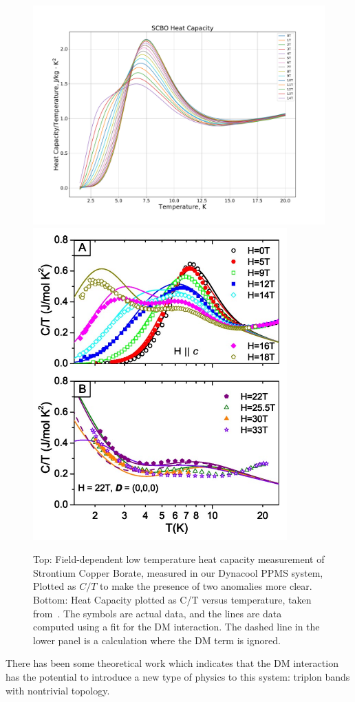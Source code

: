 \documentclass{thesis-umich}
\begin{document}
\begin{figure}
	\centering
	\caption[Low Temperature Heat Capacity of SCBO]{Top: Field-dependent low temperature heat capacity measurement of Strontium Copper Borate, measured in our Dynacool PPMS system, Plotted as $C/T$ to make the presence of two anomalies more clear. Bottom: Heat Capacity plotted as C/T versus temperature, taken from~\cite{Jorge2005}. The symbols are actual data, and the lines are data computed using a fit for the DM interaction. The dashed line in the lower panel is a calculation where the DM term is ignored.}
	\label{fig:scbo_hc}
	\includegraphics[width=\columnwidth]{figures/SCBO_total_HC_over_T.pdf}
	\includegraphics[width=0.5\columnwidth]{figures/SCBO_HC_Jorge_2005.pdf}
\end{figure}

There has been some theoretical work which indicates that the DM interaction has the potential to introduce a new type of physics to this system: triplon bands with nontrivial topology.
\end{document}
